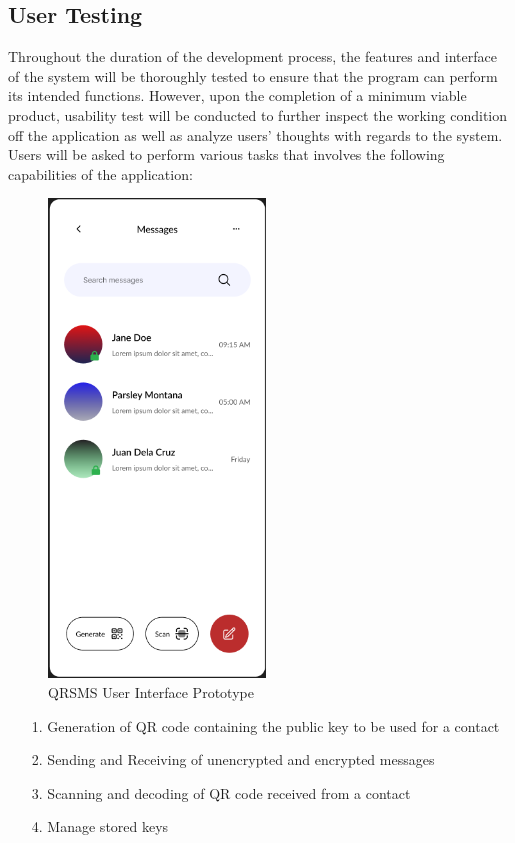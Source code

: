 \documentclass[journal]{./IEEE/IEEEtran}
\begin{document}
\subsection{User Testing}
Throughout the duration of the development process, the features and interface
of the system will be thoroughly tested to ensure that the program can perform
its intended functions. However, upon the completion of a minimum viable
product, usability test will be conducted to further inspect the working
condition off the application as well as analyze users' thoughts with regards
to the system. Users will be asked to perform various tasks that involves the
following capabilities of the application:

\begin{figure}
	\centering
	\includegraphics[height=5in]{./images/QRSMS_main_prototype.png}
	\caption{QRSMS User Interface Prototype}
	\label{QRSMSUI}
\end{figure}

\begin{itemize}
	\item[1.] Generation of QR code containing the public key to be used for
		a contact
	\item[2.] Sending and Receiving of unencrypted and encrypted messages
	\item[3.] Scanning and decoding of QR code received from a contact
	\item[4.] Manage stored keys
\end{itemize}
\end{document}
